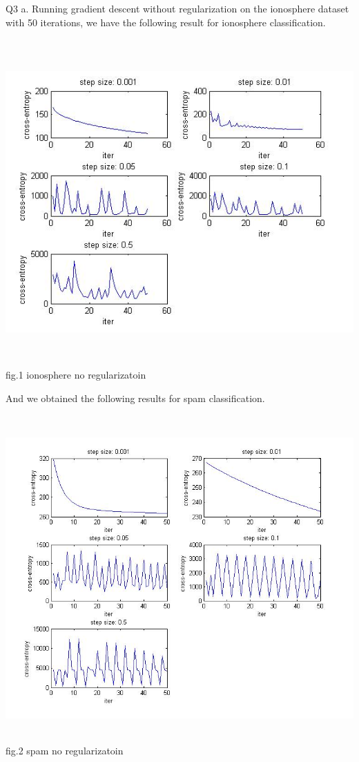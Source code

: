 \documentclass[12pt]{article}
\newenvironment{problem}[2][Problem]{\begin{trivlist}
\item[\hskip \labelsep {\bfseries #1}\hskip \labelsep {\bfseries #2}]}{\end{trivlist}}
\begin{document}
\begin{problem}{3.1 Batch Gradient Descent}
\item{Q3 a.}
Running gradient descent without regularization on the ionosphere dataset with 50 iterations, we have the following result for ionosphere classification.
\begin{center}
		\includegraphics[height=12.5cm]{ionosphere_gradient_descent.jpg}{\\fig.1 ionosphere no regularizatoin}
\end{center}
And we obtained the following results for spam classification.
\begin{center}
		\includegraphics[height=12.5cm]{spams_gradient_descent.jpg}{\\fig.2 spam no regularizatoin}

\end{center}
\end{problem}
\end{document}
